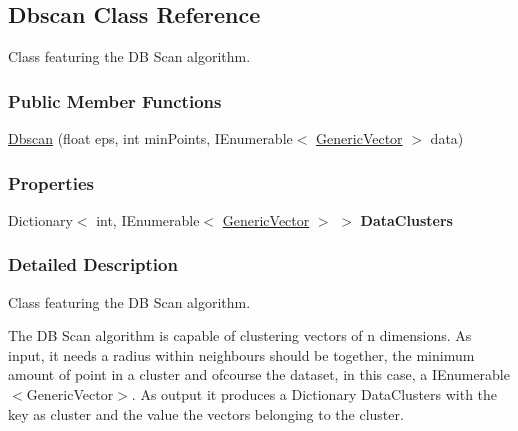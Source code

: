 \hypertarget{classDataTools_1_1clustering_1_1Dbscan}{}\subsection{Dbscan Class Reference}
\label{classDataTools_1_1clustering_1_1Dbscan}


Class featuring the DB Scan algorithm.  


\subsubsection*{Public Member Functions}
\begin{DoxyCompactItemize}
\item 
\hyperlink{classDataTools_1_1clustering_1_1Dbscan_ac54fa4e699ed60d33e90b0deab9f4006_ac54fa4e699ed60d33e90b0deab9f4006}{Dbscan} (float eps, int min\+Points, I\+Enumerable$<$ \hyperlink{classDataTools_1_1GenericVector}{Generic\+Vector} $>$ data)
\end{DoxyCompactItemize}
\subsubsection*{Properties}
\begin{DoxyCompactItemize}
\item 
\mbox{\label{classDataTools_1_1clustering_1_1Dbscan_a06317119faad60c7efd9feabeb13c795}} 
Dictionary$<$ int, I\+Enumerable$<$ \hyperlink{classDataTools_1_1GenericVector}{Generic\+Vector} $>$ $>$ {\bfseries Data\+Clusters}
\end{DoxyCompactItemize}


\subsubsection{Detailed Description}
Class featuring the DB Scan algorithm. 

The DB Scan algorithm is capable of clustering vectors of {\ttfamily n} dimensions. As input, it needs a radius within neighbours should be together, the minimum amount of point in a cluster and ofcourse the dataset, in this case, a {\ttfamily I\+Enumerable$<$\+Generic\+Vector$>$}. As output it produces a Dictionary Data\+Clusters with the key as cluster and the value the vectors belonging to the cluster. 

